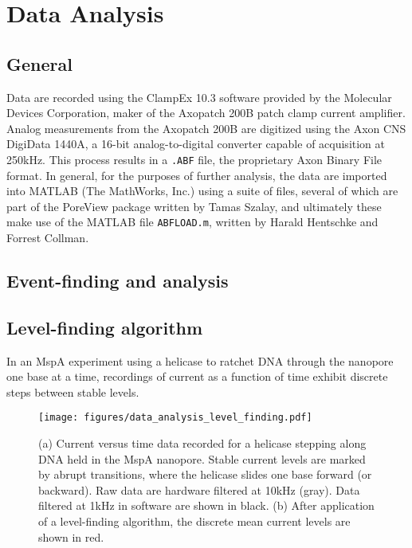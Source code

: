 \chapter{Data Analysis}
\label{data_analysis}

\section{General}

Data are recorded using the ClampEx 10.3 software provided by the Molecular Devices Corporation, maker of the Axopatch 200B patch clamp current amplifier.  Analog measurements from the Axopatch 200B are digitized using the Axon CNS DigiData 1440A, a 16-bit analog-to-digital converter capable of acquisition at 250kHz.  This process results in a \texttt{.ABF} file, the proprietary Axon Binary File format.  In general, for the purposes of further analysis, the data are imported into MATLAB (The MathWorks, Inc.) using a suite of files, several of which are part of the PoreView package written by Tamas Szalay, and ultimately these make use of the MATLAB file \texttt{ABFLOAD.m}, written by Harald Hentschke and Forrest Collman.

\section{Event-finding and analysis}

\section{Level-finding algorithm}
\label{level_finding}

In an MspA experiment using a helicase to ratchet DNA through the nanopore one base at a time, recordings of current as a function of time exhibit discrete steps between stable levels.

\citep{Schreiber2015}

\begin{figure}[h]
\begin{centering}
\texttt{[image: figures/data\_analysis\_level\_finding.pdf]}
\caption[Data analysis: level-finding]{(a) Current versus time data recorded for a helicase stepping along DNA held in the MspA nanopore.  Stable current levels are marked by abrupt transitions, where the helicase slides one base forward (or backward).  Raw data are hardware filtered at 10kHz (gray).  Data filtered at 1kHz in software are shown in black.  (b) After application of a level-finding algorithm, the discrete mean current levels are shown in red.}
\label{fig:data_analysis_levels}
\end{centering}
\end{figure}

